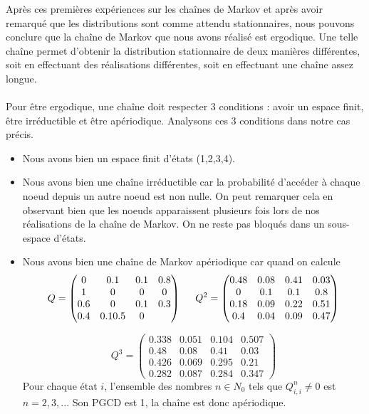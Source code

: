 \subsubsection{}
\label{section:1.1.4}
Après ces premières expériences sur les chaînes de Markov et après avoir remarqué que les distributions sont comme attendu stationnaires, nous pouvons conclure que la chaîne de Markov que nous avons réalisé est ergodique.
Une telle chaîne permet d'obtenir la distribution stationnaire de deux manières différentes, soit en effectuant des réalisations différentes, soit en effectuant une chaîne assez longue.
\\\\
Pour être ergodique, une chaîne doit respecter 3 conditions : avoir un espace finit, être irréductible et être apériodique. Analysons ces 3 conditions dans notre cas précis.

\begin{itemize}
  \item Nous avons bien un espace finit d'états (1,2,3,4).
  \item Nous avons bien une chaîne irréductible car la probabilité d'accéder à chaque noeud depuis un autre noeud est non nulle. On peut remarquer cela en observant bien que les noeuds apparaissent plusieurs fois lors de nos réalisations de la chaîne de Markov. On ne reste pas bloqués dans un sous-espace d'états.
  \item Nous avons bien une chaîne de Markov apériodique car quand on calcule 
  \begin{equation*}
    Q = \begin{pmatrix}
      0 & 0.1 & 0.1 & 0.8\\
      1 & 0 & 0 & 0\\
      0.6 & 0 & 0.1 & 0.3\\
      0.4 & 0.1 0.5 & 0
    \end{pmatrix}
    \hspace{0.5cm}
    Q^2 = \begin{pmatrix}
      0.48 & 0.08 & 0.41 & 0.03\\
      0 & 0.1 & 0.1 & 0.8\\
      0.18 & 0.09 & 0.22 & 0.51\\
      0.4 & 0.04 & 0.09 & 0.47
    \end{pmatrix}
  \end{equation*}

  \begin{equation*}
    Q^3 = \begin{pmatrix}
      0.338 & 0.051 & 0.104 & 0.507\\
      0.48 & 0.08 & 0.41 & 0.03\\
      0.426 & 0.069 & 0.295 & 0.21\\
      0.282 & 0.087 & 0.284 & 0.347
    \end{pmatrix}
\end{equation*}
Pour chaque état $i$, l'ensemble des nombres $n \in N_0$ tels que $Q_{i,i}^n \neq 0$ est $n = {2,3,...}$ Son PGCD est 1, la chaîne est donc apériodique.
\end{itemize}